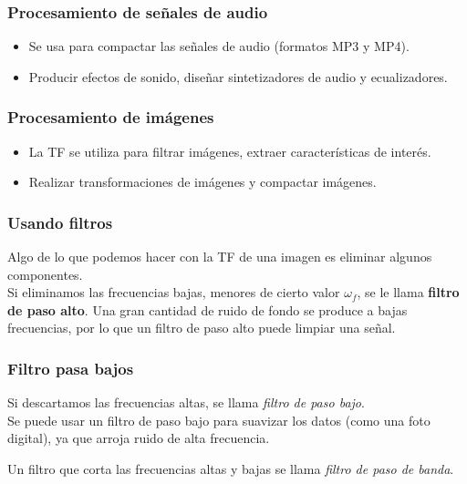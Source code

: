 \begin{frame}
\frametitle{Procesamiento de señales de audio}
\begin{itemize}[<+->]
\item Se usa para compactar las señales de audio (formatos MP3 y MP4).
\item Producir efectos de sonido, diseñar sintetizadores de audio y ecualizadores.
\end{itemize}
\end{frame}
\begin{frame}
\frametitle{Procesamiento de imágenes}
\begin{itemize}[<+->]
\item La TF se utiliza para filtrar imágenes, extraer características de interés.
\item Realizar transformaciones de imágenes y compactar imágenes.
\end{itemize}
\end{frame}
\begin{frame}
\frametitle{Usando filtros}
Algo de lo que podemos hacer con la TF de una imagen es eliminar algunos componentes.
\\
\bigskip
\pause
Si eliminamos las frecuencias bajas, menores de cierto valor $\omega_{f}$, se le llama \textbf{filtro de paso alto}. Una gran cantidad de ruido de fondo se produce a bajas frecuencias, por lo que un filtro de paso alto puede limpiar una señal.
\end{frame}
\begin{frame}
\frametitle{Filtro pasa bajos}
 Si descartamos las frecuencias altas, se llama \emph{filtro de paso bajo}.
 \\
 \bigskip
 \pause
 Se puede usar un filtro de paso bajo para suavizar los datos (como una foto digital), ya que arroja ruido de alta frecuencia.
 
 Un filtro que corta las frecuencias altas y bajas se llama \emph{filtro de paso de banda}.
\end{frame}
